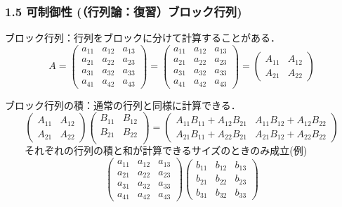 \begin{frame}[t]
\frametitle{1.5 可制御性 (（行列論：復習）ブロック行列)}
ブロック行列：行列をブロックに分けて計算することがある．
\begin{equation*}
	A =
	\left(\begin{array}{ccc}
			a_{11} & a_{12} & a_{13}\\
			a_{21} & a_{22} & a_{23}\\
			a_{31} & a_{32} & a_{33}\\
			a_{41} & a_{42} & a_{43}
	\end{array}\right)
	=
	\left(\begin{array}{c|cc}
			a_{11} & a_{12} & a_{13}\\
			a_{21} & a_{22} & a_{23}\\
			\hline
			a_{31} & a_{32} & a_{33}\\
			a_{41} & a_{42} & a_{43}
	\end{array}\right)
	=
	\left(\begin{array}{cc}
		A_{11} & A_{12} \\
		A_{21} & A_{22}
	\end{array}\right)
\end{equation*}

ブロック行列の積：通常の行列と同様に計算できる．
\begin{equation*}
	\left(\begin{array}{cc}
		A_{11} & A_{12} \\
		A_{21} & A_{22}
	\end{array}\right)
	\left(\begin{array}{cc}
		B_{11} & B_{12} \\
		B_{21} & B_{22} \\
	\end{array}\right)
	=
	\left(\begin{array}{cc}
		A_{11} B_{11} + A_{12} B_{21} & A_{11} B_{12} + A_{12} B_{22} \\
		A_{21} B_{11} + A_{22} B_{21} & A_{21} B_{12} + A_{22} B_{22}
	\end{array}\right)
\end{equation*}
　　それぞれの行列の積と和が計算できるサイズのときのみ成立(例)
\begin{equation*}
	\left(\begin{array}{c|cc}
			a_{11} & a_{12} & a_{13}\\
			a_{21} & a_{22} & a_{23}\\
			\hline
			a_{31} & a_{32} & a_{33}\\
			a_{41} & a_{42} & a_{43}
	\end{array}\right)
	\left(\begin{array}{cc|c}
			b_{11} & b_{12} & b_{13}\\
			\hline
			b_{21} & b_{22} & b_{23}\\
			b_{31} & b_{32} & b_{33}
	\end{array}\right)
\end{equation*}
\end{frame}



